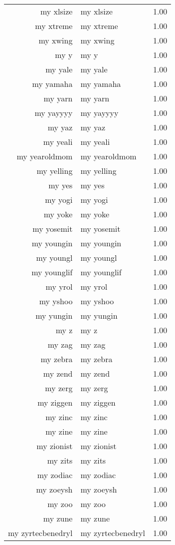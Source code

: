 \begin{table}[ht]
\begin{tabular}{rlr}
  my xlsize & my xlsize & 1.00 \\ 
  my xtreme & my xtreme & 1.00 \\ 
  my xwing & my xwing & 1.00 \\ 
  my y & my y & 1.00 \\ 
  my yale & my yale & 1.00 \\ 
  my yamaha & my yamaha & 1.00 \\ 
  my yarn & my yarn & 1.00 \\ 
  my yayyyy & my yayyyy & 1.00 \\ 
  my yaz & my yaz & 1.00 \\ 
  my yeali & my yeali & 1.00 \\ 
  my yearoldmom & my yearoldmom & 1.00 \\ 
  my yelling & my yelling & 1.00 \\ 
  my yes & my yes & 1.00 \\ 
  my yogi & my yogi & 1.00 \\ 
  my yoke & my yoke & 1.00 \\ 
  my yosemit & my yosemit & 1.00 \\ 
  my youngin & my youngin & 1.00 \\ 
  my youngl & my youngl & 1.00 \\ 
  my younglif & my younglif & 1.00 \\ 
  my yrol & my yrol & 1.00 \\ 
  my yshoo & my yshoo & 1.00 \\ 
  my yungin & my yungin & 1.00 \\ 
  my z & my z & 1.00 \\ 
  my zag & my zag & 1.00 \\ 
  my zebra & my zebra & 1.00 \\ 
  my zend & my zend & 1.00 \\ 
  my zerg & my zerg & 1.00 \\ 
  my ziggen & my ziggen & 1.00 \\ 
  my zinc & my zinc & 1.00 \\ 
  my zine & my zine & 1.00 \\ 
  my zionist & my zionist & 1.00 \\ 
  my zits & my zits & 1.00 \\ 
  my zodiac & my zodiac & 1.00 \\ 
  my zoeysh & my zoeysh & 1.00 \\ 
  my zoo & my zoo & 1.00 \\ 
  my zune & my zune & 1.00 \\ 
  my zyrtecbenedryl & my zyrtecbenedryl & 1.00 \\ 
   \hline
\end{tabular}
\end{table}
